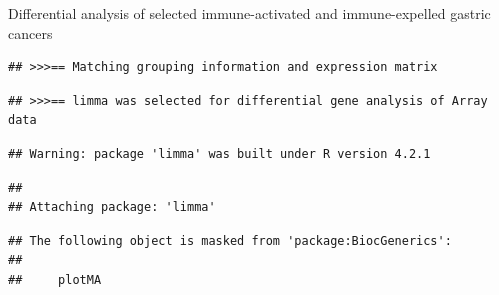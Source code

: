 \documentclass[
  12pt,
]{book}
\newenvironment{Shaded}{\begin{snugshade}}{\end{snugshade}}
\newcommand{\AttributeTok}[1]{\textcolor[rgb]{0.13,0.29,0.53}{#1}}
\newcommand{\ConstantTok}[1]{\textcolor[rgb]{0.56,0.35,0.01}{#1}}
\newcommand{\FloatTok}[1]{\textcolor[rgb]{0.00,0.00,0.81}{#1}}
\newcommand{\FunctionTok}[1]{\textcolor[rgb]{0.13,0.29,0.53}{\textbf{#1}}}
\newcommand{\NormalTok}[1]{#1}
\newcommand{\OtherTok}[1]{\textcolor[rgb]{0.56,0.35,0.01}{#1}}
\newcommand{\SpecialCharTok}[1]{\textcolor[rgb]{0.81,0.36,0.00}{\textbf{#1}}}
\newcommand{\StringTok}[1]{\textcolor[rgb]{0.31,0.60,0.02}{#1}}
\begin{document}
Differential analysis of selected immune-activated and immune-expelled gastric cancers

\begin{Shaded}
\end{Shaded}

\begin{verbatim}
## >>>== Matching grouping information and expression matrix
\end{verbatim}

\begin{verbatim}
## >>>== limma was selected for differential gene analysis of Array data
\end{verbatim}

\begin{verbatim}
## Warning: package 'limma' was built under R version 4.2.1
\end{verbatim}

\begin{verbatim}
## 
## Attaching package: 'limma'
\end{verbatim}

\begin{verbatim}
## The following object is masked from 'package:BiocGenerics':
## 
##     plotMA
\end{verbatim}
\end{document}
